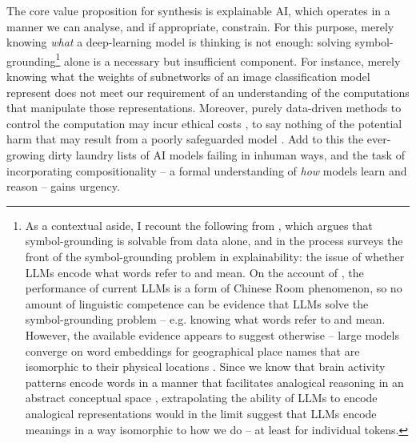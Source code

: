 The core value proposition for synthesis is explainable AI, which operates in a manner we can analyse, and if appropriate, constrain. For this purpose, merely knowing \emph{what} a deep-learning model is thinking is not enough: solving symbol-grounding\footnote{As a contextual aside, I recount the following from \citep{}, which argues that symbol-grounding is solvable from data alone, and in the process surveys the front of the symbol-grounding problem in explainability: the issue of whether LLMs encode what words refer to and mean. On the account of \citep{bender_climbing_2020}, the performance of current LLMs is a form of Chinese Room \citep{searle_minds_1980} phenomenon, so no amount of linguistic competence can be evidence that LLMs solve the symbol-grounding problem -- e.g. knowing what words refer to and mean. However, the available evidence appears to suggest otherwise -- large models converge on word embeddings for geographical place names that are isomorphic to their physical locations \citep{}. Since we know that brain activity patterns encode words in a manner that facilitates analogical reasoning in an abstract conceptual space \citep{}, extrapolating the ability of LLMs to encode analogical representations would in the limit suggest that LLMs encode meanings in a way isomorphic to how we do -- at least for individual tokens.} alone is a necessary but insufficient component. For instance, merely knowing what the weights of subnetworks of an image classification model represent \citep{} does not meet our requirement of an understanding of the computations that manipulate those representations. Moreover, purely data-driven methods to control the computation may incur ethical costs \citep{}, to say nothing of the potential harm that may result from a poorly safeguarded model \citep{}. Add to this the ever-growing dirty laundry lists of AI models failing \citep{} in inhuman ways, and the task of incorporating compositionality -- a formal understanding of \emph{how} models learn and reason -- gains urgency.\\

